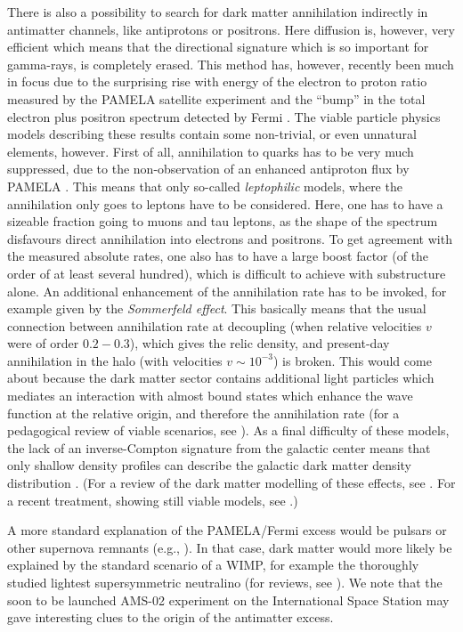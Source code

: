 \documentclass[10pt,aps,pra,reprint,amsmath,amsfonts,amssymb,showpacs]{revtex4-1}
\begin{document}
There is also a possibility to search for dark matter annihilation
indirectly in antimatter channels, like antiprotons or positrons. Here
diffusion is, however, very efficient which means that the directional
signature which is so important for gamma-rays, is completely
erased. This method has, however, recently been much in focus due to
the surprising rise with energy of the electron to proton ratio
measured by the PAMELA satellite experiment \cite{Adriani:2008zr} and
the ``bump'' in the total electron plus positron spectrum detected by
Fermi \cite{Abdo:2009zk}. The viable particle physics models
describing these results contain some non-trivial, or even unnatural
elements, however. First of all, annihilation to quarks has to be very
much suppressed, due to the non-observation of an enhanced antiproton
flux by PAMELA \cite{Adriani:2010rc}. This means that only so-called
{\em leptophilic} models, where the annihilation only goes to leptons
have to be considered. Here, one has to have a sizeable fraction going
to muons and tau leptons, as the shape of the spectrum disfavours
direct annihilation into electrons and positrons. To get agreement
with the measured absolute rates, one also has to have a large boost
factor (of the order of at least several hundred), which is difficult
to achieve with substructure alone. An additional enhancement of the
annihilation rate has to be invoked, for example given by the {\em
  Sommerfeld effect}. This basically means that the usual connection
between annihilation rate at decoupling (when relative velocities $v$
were of order $0.2 - 0.3$), which gives the relic density, and
present-day annihilation in the halo (with velocities $v\sim 10^{-3}$)
is broken. This would come about because the dark matter sector
contains additional light particles which mediates an interaction with
almost bound states which enhance the wave function at the relative
origin, and therefore the annihilation rate (for a pedagogical review
of viable scenarios, see \cite{ArkaniHamed:2008qn}). As a final
difficulty of these models, the lack of an inverse-Compton signature
from the galactic center means that only shallow density profiles can
describe the galactic dark matter density distribution
\cite{Bertone:2008xr,Cirelli:2008pk,Bergstrom:2008ag}. (For a review
of the dark matter modelling of these effects, see
\cite{Bergstrom:2009ib}. For a recent treatment, showing still viable
models, see \cite{Finkbeiner:2010sm}.)

A more standard explanation of the PAMELA/Fermi excess would be
pulsars or other supernova remnants (e.g.,
\cite{Hooper:2008kg,Ahlers:2009ae}). In that case, dark matter would
more likely be explained by the standard scenario of a WIMP, for
example the thoroughly studied lightest supersymmetric neutralino
(for reviews, see
\cite{Jungman:1995df,Bergstrom:2000pn,Bertone:2004pz}). We note that
the soon to be launched AMS-02 experiment on the International Space
Station \cite{ams02} may gave interesting clues to the origin of the
antimatter excess.
\end{document}
